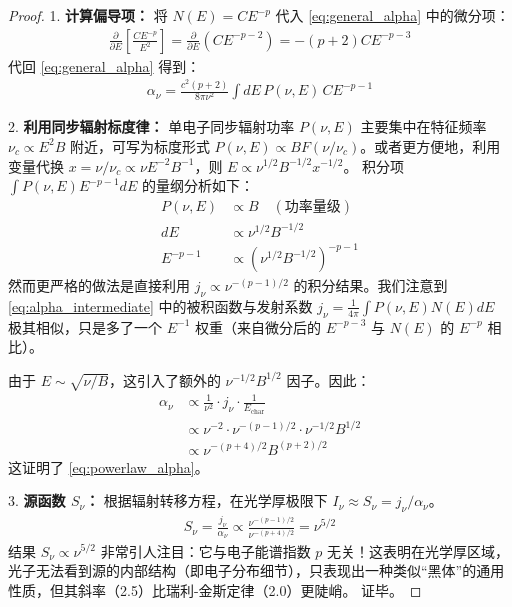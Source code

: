 \documentclass[12pt,oneside]{ctexart}
\theoremstyle{definition}
\theoremstyle{plain}
\theoremstyle{remark}
\begin{document}
\begin{proof}
    1. \textbf{计算偏导项：}
    将 $N(E) = C E^{-p}$ 代入 \eqref{eq:general_alpha} 中的微分项：
    \begin{align}
        \frac{\partial}{\partial E} \left[ \frac{C E^{-p}}{E^2} \right] = \frac{\partial}{\partial E} (C E^{-p-2}) = -(p+2) C E^{-p-3}
    \end{align}
    代回 \eqref{eq:general_alpha} 得到：
    \begin{align}
        \alpha_{\nu} = \frac{c^2 (p+2)}{8\pi \nu^2} \int dE \, P(\nu, E) \, C E^{-p-1} \label{eq:alpha_intermediate}
    \end{align}
    
    2. \textbf{利用同步辐射标度律：}
    单电子同步辐射功率 $P(\nu, E)$ 主要集中在特征频率 $\nu_c \propto E^2 B$ 附近，可写为标度形式 $P(\nu, E) \propto B F(\nu/\nu_c)$。或者更方便地，利用变量代换 $x = \nu / \nu_c \propto \nu E^{-2} B^{-1}$，则 $E \propto \nu^{1/2} B^{-1/2} x^{-1/2}$。
    积分项 $\int P(\nu, E) E^{-p-1} dE$ 的量纲分析如下：
    \begin{align}
        P(\nu, E) &\propto B \quad (\text{功率量级}) \\
        dE &\propto \nu^{1/2} B^{-1/2} \\
        E^{-p-1} &\propto (\nu^{1/2} B^{-1/2})^{-p-1}
    \end{align}
    然而更严格的做法是直接利用 $j_{\nu} \propto \nu^{-(p-1)/2}$ 的积分结果。我们注意到 \eqref{eq:alpha_intermediate} 中的被积函数与发射系数 $j_{\nu} = \frac{1}{4\pi} \int P(\nu, E) N(E) dE$ 极其相似，只是多了一个 $E^{-1}$ 权重（来自微分后的 $E^{-p-3}$ 与 $N(E)$ 的 $E^{-p}$ 相比）。
    
    由于 $E \sim \sqrt{\nu/B}$，这引入了额外的 $\nu^{-1/2} B^{1/2}$ 因子。因此：
    \begin{align}
        \alpha_{\nu} &\propto \frac{1}{\nu^2} \cdot j_{\nu} \cdot \frac{1}{E_{\text{char}}} \\
        &\propto \nu^{-2} \cdot \nu^{-(p-1)/2} \cdot \nu^{-1/2} B^{1/2} \\
        &\propto \nu^{-(p+4)/2} B^{(p+2)/2}
    \end{align}
    这证明了 \eqref{eq:powerlaw_alpha}。
    
    3. \textbf{源函数 $S_{\nu}$：}
    根据辐射转移方程，在光学厚极限下 $I_{\nu} \approx S_{\nu} = j_{\nu} / \alpha_{\nu}$。
    \begin{align}
        S_{\nu} = \frac{j_{\nu}}{\alpha_{\nu}} \propto \frac{\nu^{-(p-1)/2}}{\nu^{-(p+4)/2}} = \nu^{5/2}
    \end{align}
    结果 $S_{\nu} \propto \nu^{5/2}$ 非常引人注目：它与电子能谱指数 $p$ 无关！这表明在光学厚区域，光子无法看到源的内部结构（即电子分布细节），只表现出一种类似“黑体”的通用性质，但其斜率（2.5）比瑞利-金斯定律（2.0）更陡峭。
    证毕。
\end{proof}
\end{document}

